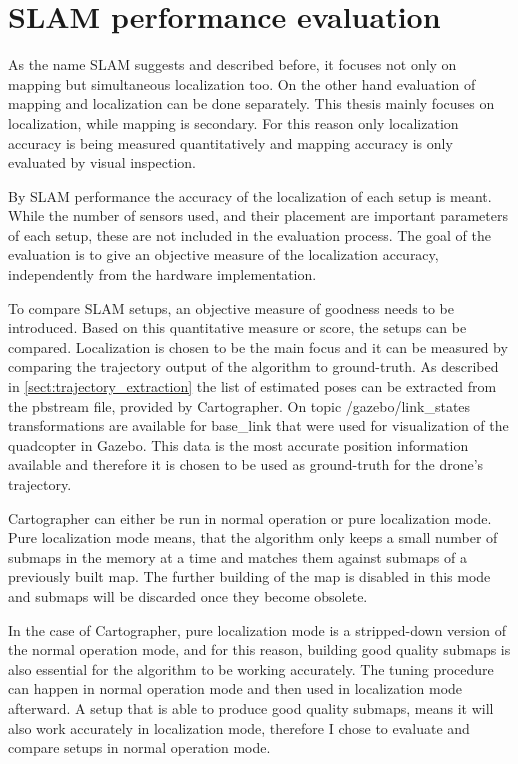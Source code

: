 \section{SLAM performance evaluation}
As the name SLAM suggests and described before, it focuses not only on mapping but simultaneous
localization too. On the other hand evaluation of mapping and localization can be done separately.
This thesis mainly focuses on localization, while mapping is secondary. For this
reason only localization accuracy is being measured quantitatively and mapping accuracy is
only evaluated by visual inspection.

By SLAM performance the accuracy of the localization of each setup is meant. While the number of
sensors used, and their placement are important parameters of each setup, these are not included in
the evaluation process. The goal of the evaluation is to give an objective measure of the localization
accuracy, independently from the hardware implementation.

To compare SLAM setups, an objective measure of goodness needs to be introduced. Based
on this quantitative measure or score, the setups can be compared. Localization is chosen to be
the main focus and it can be measured by comparing the trajectory output of the algorithm
to ground-truth.
As described in \ref{sect:trajectory_extraction} the list of estimated poses can be extracted
from the pbstream file, provided by Cartographer. On topic /gazebo/link\_states transformations
are available for base\_link that were used for visualization of the quadcopter in Gazebo.
This data is the most accurate position information available and therefore it is chosen to be used as
ground-truth for the drone's trajectory.

Cartographer can either be run in normal operation or pure localization mode. Pure localization
mode means, that the algorithm only keeps a small number of submaps in the memory at a time and
matches them against submaps of a previously built map. The further building of the map is disabled
in this mode and submaps will be discarded once they become obsolete.

In the case of Cartographer, pure localization mode is a stripped-down version of the normal
operation mode, and for this reason, building good quality submaps is also essential for the algorithm to
be working accurately. The tuning procedure can happen in normal operation mode and then used in
localization mode afterward. A setup that is able to produce good quality submaps, means it
will also work accurately in localization mode, therefore I chose to evaluate and compare setups
in normal operation mode.

